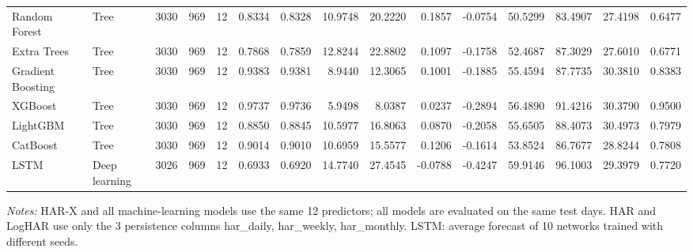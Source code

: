 \begin{table}[htbp]
{\begin{tabular}{llrrrrrrrrrrrrr}
Random Forest & Tree & 3030 & 969 & 12 & 0.8334 & 0.8328 & 10.9748 & 20.2220 & 0.1857 & -0.0754 & 50.5299 & 83.4907 & 27.4198 & 0.6477 \\
Extra Trees & Tree & 3030 & 969 & 12 & 0.7868 & 0.7859 & 12.8244 & 22.8802 & 0.1097 & -0.1758 & 52.4687 & 87.3029 & 27.6010 & 0.6771 \\
Gradient Boosting & Tree & 3030 & 969 & 12 & 0.9383 & 0.9381 & 8.9440 & 12.3065 & 0.1001 & -0.1885 & 55.4594 & 87.7735 & 30.3810 & 0.8383 \\
XGBoost & Tree & 3030 & 969 & 12 & 0.9737 & 0.9736 & 5.9498 & 8.0387 & 0.0237 & -0.2894 & 56.4890 & 91.4216 & 30.3790 & 0.9500 \\
LightGBM & Tree & 3030 & 969 & 12 & 0.8850 & 0.8845 & 10.5977 & 16.8063 & 0.0870 & -0.2058 & 55.6505 & 88.4073 & 30.4973 & 0.7979 \\
CatBoost & Tree & 3030 & 969 & 12 & 0.9014 & 0.9010 & 10.6959 & 15.5577 & 0.1206 & -0.1614 & 53.8524 & 86.7677 & 28.8244 & 0.7808 \\
LSTM & Deep learning & 3026 & 969 & 12 & 0.6933 & 0.6920 & 14.7740 & 27.4545 & -0.0788 & -0.4247 & 59.9146 & 96.1003 & 29.3979 & 0.7720 \\
\bottomrule
\end{tabular}%
}
\par\vspace{2pt}\footnotesize\textit{Notes:} HAR-X and all machine-learning models use the same 12 predictors; all models are evaluated on the same test days. HAR and LogHAR use only the 3 persistence columns har\_daily, har\_weekly, har\_monthly. LSTM: average forecast of 10 networks trained with different seeds.
\end{table}
